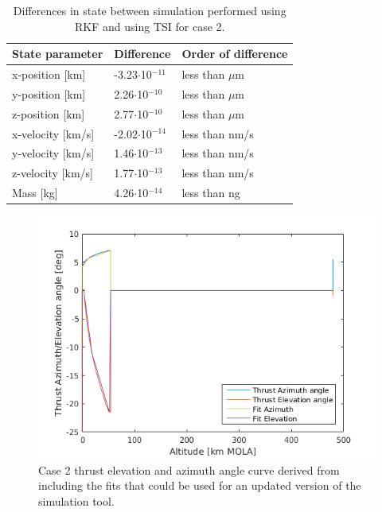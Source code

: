  

\begin{table}[H]
\begin{center}
\caption{Differences in state between simulation performed using \ac{RKF} and using \ac{TSI} for case 2.}
\label{tab:differenceEndStateCase2}
\begin{tabular}{|l|l|l|}
\hline 
\textbf{State parameter} & \textbf{Difference} & \textbf{Order of difference} \\ \hline \hline
x-position [km] & -3.23$\cdot$10$^{-11}$ & less than $\mu$m \\ \hline
y-position [km] & 2.26$\cdot$10$^{-10}$ & less than $\mu$m \\ \hline
z-position [km] & 2.77$\cdot$10$^{-10}$ & less than $\mu$m \\ \hline
x-velocity [km/s] & -2.02$\cdot$10$^{-14}$ & less than nm/s \\ \hline
y-velocity [km/s] & 1.46$\cdot$10$^{-13}$ & less than nm/s \\ \hline
z-velocity [km/s] & 1.77$\cdot$10$^{-13}$ & less than nm/s \\ \hline
Mass [kg] &  4.26$\cdot$10$^{-14}$ & less than ng \\ \hline
		

\end{tabular}
\end{center}
\end{table}






\begin{figure}[H]
\centering
\includegraphics[width=0.7 \textwidth]{figures/verification/case2/thrustAzimuthAndElevationDerivedFromCase2Version2.png}
\caption{Case 2 thrust elevation and azimuth angle curve derived from \cite{benito2016trajectory} including the fits that could be used for an updated version of the simulation tool.}
\label{fig:thrustAzimuthAndElevationDerivedFromCase2Version2}
\end{figure}


%
%


